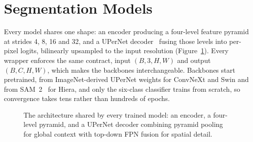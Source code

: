 \documentclass[report.tex]{subfiles}
\begin{document}
\section{Segmentation Models}
\label{sec:segmodels}

Every model shares one shape: an encoder producing a four-level feature
pyramid at strides 4, 8, 16 and 32, and a UPerNet decoder~\cite{upernet2018}
fusing those levels into per-pixel logits, bilinearly upsampled to the input
resolution (Figure~\ref{fig:arch}). Every wrapper enforces the same contract,
input $(B, 3, H, W)$ and output $(B, C, H, W)$, which makes the backbones
interchangeable. Backbones start pretrained, from ImageNet-derived UPerNet
weights for ConvNeXt and Swin and from SAM~2~\cite{sam2_2024} for Hiera, and
only the six-class classifier trains from scratch, so convergence takes tens
rather than hundreds of epochs.

\begin{figure}[t]
    \centering
    \caption[Shared segmentation architecture]{The architecture shared by
    every trained model: an encoder, a four-level pyramid, and a UPerNet
    decoder combining pyramid pooling~\cite{pspnet2017} for global context with
    top-down FPN fusion for spatial detail.}
    \label{fig:arch}
\end{figure}
\end{document}
